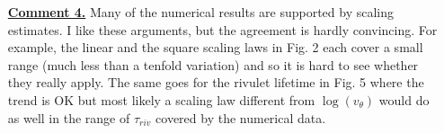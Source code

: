 \documentclass[12pt,english]{article}
\begin{document}
\begin{itemize}




\item[ \textbf{\underline{Comment 4.}}]
{ 
Many of the numerical results are supported by scaling estimates. I
like these arguments, but the agreement is hardly convincing. For
example, the linear and the square scaling laws in Fig. 2 each cover a
small range (much less than a tenfold variation) and so it is hard to
see whether they really apply. 
The same goes for the rivulet lifetime in Fig. 5 where the trend is OK but most likely a scaling law different from $\log(v_{\theta})$ would do as well in the range of $\tau_{riv}$ covered by the numerical data.
}


\end{itemize}
\end{document}
